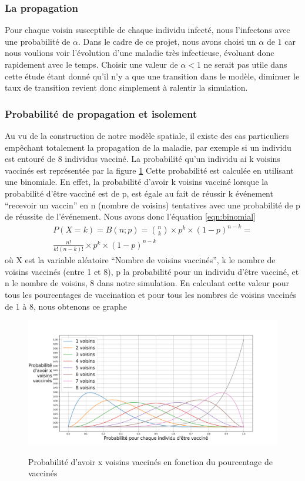 \documentclass[journal, a4paper]{IEEEtran}
\begin{document}
	\subsubsection{La propagation}
	Pour chaque voisin susceptible de chaque individu infecté, nous l'infectons avec une probabilité de $\alpha$. Dans le cadre de ce projet, nous avons choisi un $\alpha$ de $1$ car nous voulions voir l'évolution d'une maladie très infectieuse, évoluant donc rapidement avec le temps. Choisir une valeur de $\alpha < 1$ ne serait pas utile dans cette étude étant donné qu'il n'y a que une transition dans le modèle, diminuer le taux de transition revient donc simplement à ralentir la simulation.
	\subsubsection{Probabilité de propagation et isolement}
	Au vu de la construction de notre modèle spatiale, il existe des cas particuliers empêchant totalement la propagation de la maladie, par exemple si un individu est entouré de 8 individus vacciné.
	La probabilité qu'un individu ai k voisins vaccinés est représentée par la figure \ref{fig:probNeighbour}
	Cette probabilité est calculée en utilisant une binomiale. En effet, la probabilité d'avoir k voisins vacciné lorsque la probabilité d'être vacciné est de p, est égale au fait de réussir k événement ``recevoir un vaccin'' en n (nombre de voisins) tentatives avec une probabilité de p de réussite de l'événement. Nous avons donc l'équation \ref{eqn:binomial}
	\begin{equation}
		\label{eqn:binomial}
		\begin{aligned}
			P(X = k) = B(n;p) = {n \choose k}\times p^k \times (1-p)^{n-k} = \\ \frac{n!}{k!(n-k)!}\times p^k \times (1-p)^{n-k}
		\end{aligned}
	\end{equation}
	où X est la variable aléatoire ``Nombre de voisins vaccinés'', k le nombre de voisins vaccinés (entre 1 et 8), p la probabilité pour un individu d'être vacciné, et n le nombre de voisins, 8 dans notre simulation. En calculant cette valeur pour tous les pourcentages de vaccination et pour tous les nombres de voisins vaccinés de 1 à 8, nous obtenons ce graphe

	\begin{figure}[!hbt]
		\caption{Probabilité d'avoir x voisins vaccinés en fonction du pourcentage de vaccinés}
		\includegraphics[width=\columnwidth]{probNeighbour}
		\label{fig:probNeighbour}
	\end{figure}
\end{document}

